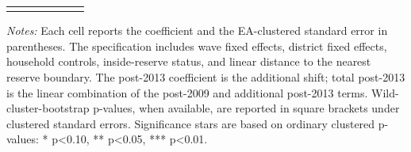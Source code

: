 \begin{table}[!htbp]
\begin{tabular}{llccccc}
\addlinespace
\bottomrule
\end{tabular}
\begin{minipage}{0.98\textwidth}
\footnotesize \textit{Notes:} Each cell reports the coefficient and the EA-clustered standard error in parentheses. The specification includes wave fixed effects, district fixed effects, household controls, inside-reserve status, and linear distance to the nearest reserve boundary. The post-2013 coefficient is the additional shift; total post-2013 is the linear combination of the post-2009 and additional post-2013 terms. Wild-cluster-bootstrap p-values, when available, are reported in square brackets under clustered standard errors. Significance stars are based on ordinary clustered p-values: * p<0.10, ** p<0.05, *** p<0.01.
\end{minipage}
\end{table}
